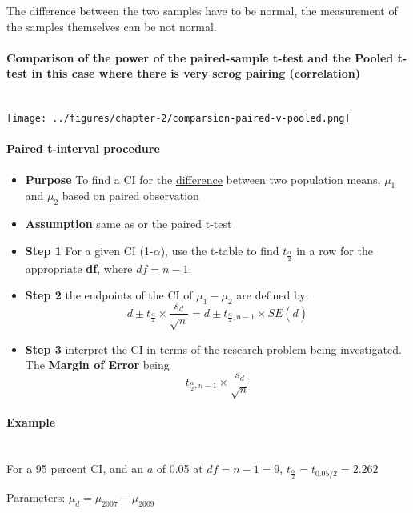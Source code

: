 \documentclass[../STAT-252-Notes.tex]{subfiles}
\begin{document}
\begin{Note}
  The difference between the two samples have to be normal, the measurement of the samples themselves can be not normal.
\end{Note}


\paragraph{Comparison of the power of the paired-sample t-test and the Pooled t-test in this case where there is very scrog pairing (correlation)}~\\
\texttt{[image: ../figures/chapter-2/comparsion-paired-v-pooled.png]}



\paragraph{Paired t-interval procedure}
\begin{itemize}
  \item \textbf{Purpose} To find a CI for the \underline{difference} between two population means, $\mu_1$ and $\mu_2$ based on paired observation
  \item \textbf{Assumption} same as or the paired t-test 
  \item \textbf{Step 1} For a given CI (1-$\alpha$), use the t-table to find $t_{\frac{\alpha}{2}}$ in a row for the appropriate \textbf{df}, where $df = n-1$.
  \item \textbf{Step 2} the endpoints of the CI of $\mu_1-\mu_2$ are defined by:
    \[ 
      \overline{d} \pm t_{\frac{\alpha}{2}}\times \frac{s_d}{\sqrt{n} } = \overline{d}\pm t_{\frac{\alpha}{2},n-1}\times SE(\overline{d}) 
    \] 
    \item \textbf{Step 3} interpret the CI in terms of the research problem being investigated.
      The \textbf{Margin of Error} being 
      \[ 
      t_{\frac{\alpha}{2},n-1} \times \frac{s_d}{\sqrt{n} } 
      \] 
      
\end{itemize}

\paragraph{Example}
~\\
For a 95 percent CI, and an $a$ of 0.05 at $df = n-1 = 9$, $t_{\frac{\alpha}{2}}= t_{0.05 / 2} = 2.262$

Parameters: $\mu_d = \mu_{2007} - \mu_{2009}$
\end{document}
